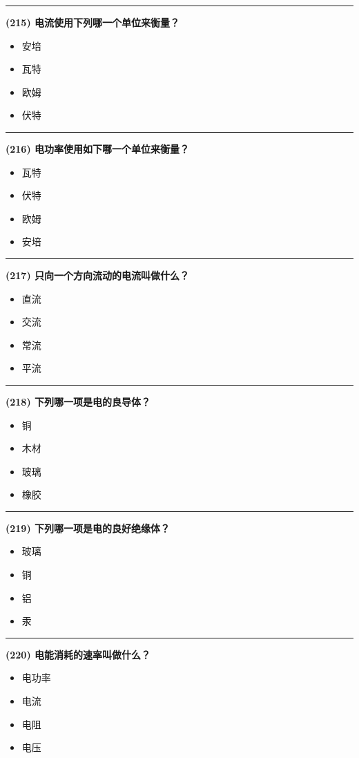 \documentclass[twocolumn]{ctexart}  %
\begin{document}
\noindent\rule{0.5\textwidth}{1pt}
\heiti \textbf{(215) 电流使用下列哪一个单位来衡量？} \songti {\color{gray} [LK1134] }
\begin{itemize}
	\item  安培
	\item  瓦特
	\item  欧姆
	\item  伏特
\end{itemize}


\noindent\rule{0.5\textwidth}{1pt}
\heiti \textbf{(216) 电功率使用如下哪一个单位来衡量？} \songti {\color{gray} [LK1135] }
\begin{itemize}
	\item  瓦特
	\item  伏特
	\item  欧姆
	\item  安培
\end{itemize}


\noindent\rule{0.5\textwidth}{1pt}
\heiti \textbf{(217) 只向一个方向流动的电流叫做什么？} \songti {\color{gray} [LK1136] }
\begin{itemize}
	\item  直流
	\item  交流
	\item  常流
	\item  平流
\end{itemize}


\noindent\rule{0.5\textwidth}{1pt}
\heiti \textbf{(218) 下列哪一项是电的良导体？} \songti {\color{gray} [LK1138] }
\begin{itemize}
	\item  铜
	\item  木材
	\item  玻璃
	\item  橡胶
\end{itemize}


\noindent\rule{0.5\textwidth}{1pt}
\heiti \textbf{(219) 下列哪一项是电的良好绝缘体？} \songti {\color{gray} [LK1139] }
\begin{itemize}
	\item  玻璃
	\item  铜
	\item  铝
	\item  汞
\end{itemize}


\noindent\rule{0.5\textwidth}{1pt}
\heiti \textbf{(220) 电能消耗的速率叫做什么？} \songti {\color{gray} [LK1140] }
\begin{itemize}
	\item  电功率
	\item  电流
	\item  电阻
	\item  电压
\end{itemize}
\end{document}
